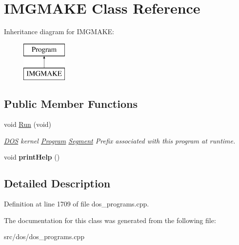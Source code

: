 \hypertarget{classIMGMAKE}{\section{I\-M\-G\-M\-A\-K\-E Class Reference}
\label{classIMGMAKE}
}
Inheritance diagram for I\-M\-G\-M\-A\-K\-E\-:\begin{figure}[H]
\begin{center}
\leavevmode
\includegraphics[height=2.000000cm]{classIMGMAKE}
\end{center}
\end{figure}
\subsection*{Public Member Functions}
\begin{DoxyCompactItemize}
\item 
\hypertarget{classIMGMAKE_afbd2116356dab83d08b978c72ee74340}{void \hyperlink{classIMGMAKE_afbd2116356dab83d08b978c72ee74340}{Run} (void)}\label{classIMGMAKE_afbd2116356dab83d08b978c72ee74340}

\begin{DoxyCompactList}\small\item\em \hyperlink{classDOS}{D\-O\-S} kernel \hyperlink{classProgram}{Program} \hyperlink{structSegment}{Segment} Prefix associated with this program at runtime. \end{DoxyCompactList}\item 
\hypertarget{classIMGMAKE_aed2e86f96068d3380ddc72eb78377938}{void {\bfseries print\-Help} ()}\label{classIMGMAKE_aed2e86f96068d3380ddc72eb78377938}

\end{DoxyCompactItemize}


\subsection{Detailed Description}


Definition at line 1709 of file dos\-\_\-programs.\-cpp.



The documentation for this class was generated from the following file\-:\begin{DoxyCompactItemize}
\item 
src/dos/dos\-\_\-programs.\-cpp\end{DoxyCompactItemize}
